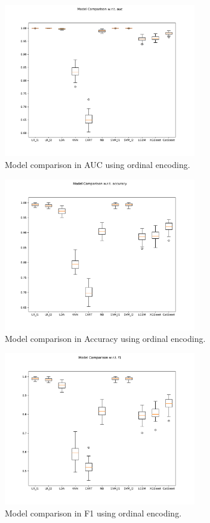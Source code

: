 \documentclass[11pt]{article}
\begin{document}
\begin{figure}[H]
    \centering
    \includegraphics[width=0.75\textwidth]{ordinal/model_compare_auc.pdf}
    \caption{Model comparison in AUC using ordinal encoding.}
    \label{fig:ordinal_auc_compare}
\end{figure}

\begin{figure}[H]
    \centering
    \includegraphics[width=0.75\textwidth]{ordinal/model_compare_accuracy.pdf}
    \caption{Model comparison in Accuracy using ordinal encoding.}
    \label{fig:ordinal_accuracy_compare}
\end{figure}

\begin{figure}[H]
    \centering
    \includegraphics[width=0.75\textwidth]{ordinal/model_compare_f1.pdf}
    \caption{Model comparison in F1 using ordinal encoding.}
    \label{fig:ordinal_f1_compare}
\end{figure}
\end{document}
